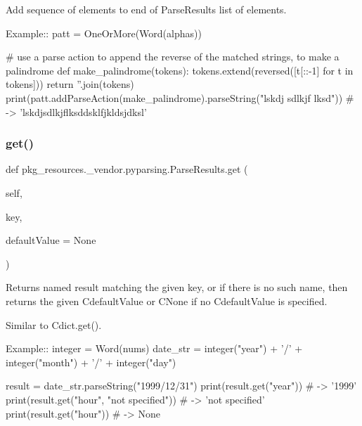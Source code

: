 \begin{DoxyVerb}Add sequence of elements to end of ParseResults list of elements.

Example::
    patt = OneOrMore(Word(alphas))
    
    # use a parse action to append the reverse of the matched strings, to make a palindrome
    def make_palindrome(tokens):
tokens.extend(reversed([t[::-1] for t in tokens]))
return ''.join(tokens)
    print(patt.addParseAction(make_palindrome).parseString("lskdj sdlkjf lksd")) # -> 'lskdjsdlkjflksddsklfjkldsjdksl'
\end{DoxyVerb}
 \mbox{\label{classpkg__resources_1_1__vendor_1_1pyparsing_1_1ParseResults_a2ebba8b6bb0c2553f02fa40912e5d830}} 
\subsubsection{\texorpdfstring{get()}{get()}}
{\footnotesize\ttfamily def pkg\+\_\+resources.\+\_\+vendor.\+pyparsing.\+Parse\+Results.\+get (\begin{DoxyParamCaption}\item[{}]{self,  }\item[{}]{key,  }\item[{}]{default\+Value = {\ttfamily None} }\end{DoxyParamCaption})}

\begin{DoxyVerb}Returns named result matching the given key, or if there is no
such name, then returns the given C{defaultValue} or C{None} if no
C{defaultValue} is specified.

Similar to C{dict.get()}.

Example::
    integer = Word(nums)
    date_str = integer("year") + '/' + integer("month") + '/' + integer("day")           

    result = date_str.parseString("1999/12/31")
    print(result.get("year")) # -> '1999'
    print(result.get("hour", "not specified")) # -> 'not specified'
    print(result.get("hour")) # -> None
\end{DoxyVerb}
 \mbox{\label{classpkg__resources_1_1__vendor_1_1pyparsing_1_1ParseResults_a84fe6f0686f055144e26c2102c535689}} 
